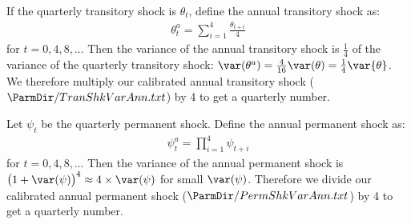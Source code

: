 
If the quarterly transitory shock is $\theta_t$, define the annual transitory shock as:
\begin{eqnarray*}
\theta^a_t = \sum_{i=1}^{4}\frac{\theta_{t+i}}{4}
\end{eqnarray*}
for $t = {0,4,8,\dots}$ Then the variance of the annual transitory shock is $\frac{1}{4}$ of the variance of the quarterly transitory shock: $\var(\theta^a)=\frac{4}{16}\var(\theta)=\frac14\var{\theta}$. We therefore multiply our calibrated annual transitory shock ($ \ParmDir/TranShkVarAnn.txt $) by 4 to get a quarterly number.

Let $\psi_t$ be the quarterly permanent shock. Define the annual permanent shock as:
\begin{eqnarray*}
\psi^a_t = \prod_{i=1}^{4} \psi_{t+i}
\end{eqnarray*}
for $t ={0,4,8,\dots}$ Then the variance of the annual permanent shock is $\big(1+\var(\psi)\big)^4 \approx 4\times\var(\psi)$ for small $\var(\psi)$. Therefore we divide our calibrated annual permanent shock ($ \ParmDir/PermShkVarAnn.txt $) by 4 to get a quarterly number.


